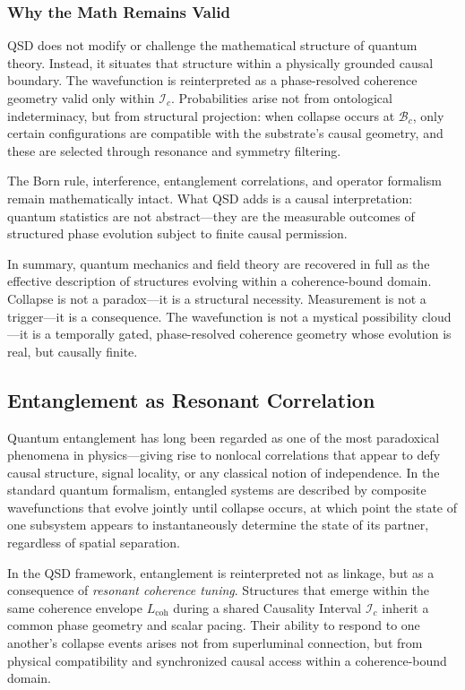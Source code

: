 \documentclass[preprints,article,submit,pdftex,moreauthors]{Definitions/mdpi}
\begin{document}
\subsubsection{Why the Math Remains Valid}

QSD does not modify or challenge the mathematical structure of quantum theory. Instead, it situates that structure within a physically grounded causal boundary. The wavefunction is reinterpreted as a phase-resolved coherence geometry valid only within \( \mathcal{I}_c \). Probabilities arise not from ontological indeterminacy, but from structural projection: when collapse occurs at \( \mathcal{B}_c \), only certain configurations are compatible with the substrate's causal geometry, and these are selected through resonance and symmetry filtering.

The Born rule, interference, entanglement correlations, and operator formalism remain mathematically intact. What QSD adds is a causal interpretation: quantum statistics are not abstract—they are the measurable outcomes of structured phase evolution subject to finite causal permission.

\smallskip

In summary, quantum mechanics and field theory are recovered in full as the effective description of structures evolving within a coherence-bound domain. Collapse is not a paradox—it is a structural necessity. Measurement is not a trigger—it is a consequence. The wavefunction is not a mystical possibility cloud—it is a temporally gated, phase-resolved coherence geometry whose evolution is real, but causally finite.


\subsection{Entanglement as Resonant Correlation}
\label{subsec:entanglement}

Quantum entanglement has long been regarded as one of the most paradoxical phenomena in physics—giving rise to nonlocal correlations that appear to defy causal structure, signal locality, or any classical notion of independence. In the standard quantum formalism, entangled systems are described by composite wavefunctions that evolve jointly until collapse occurs, at which point the state of one subsystem appears to instantaneously determine the state of its partner, regardless of spatial separation.

In the QSD framework, entanglement is reinterpreted not as linkage, but as a consequence of \textit{resonant coherence tuning}. Structures that emerge within the same coherence envelope \( L_{\text{coh}} \) during a shared Causality Interval \( \mathcal{I}_c \) inherit a common phase geometry and scalar pacing. Their ability to respond to one another’s collapse events arises not from superluminal connection, but from physical compatibility and synchronized causal access within a coherence-bound domain.
\end{document}
